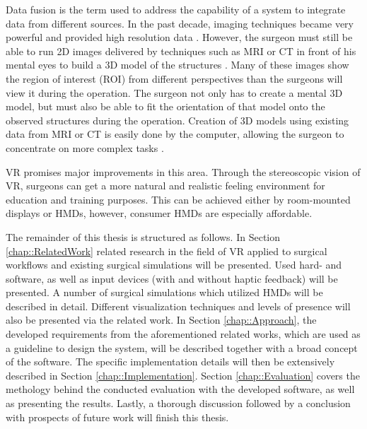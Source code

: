Data fusion is the term used to address the capability of a system to integrate data from different sources.
In the past decade, imaging techniques became very powerful and provided high resolution data \cite{RN2}.
However, the surgeon must still be able to run 2D images delivered by techniques such as MRI or CT in front of his mental eyes to build a 3D model of the structures \cite{Fonseca.2018}.
Many of these images show the region of interest (ROI) from different perspectives than the surgeons will view it during the operation.
The surgeon not only has to create a mental 3D model, but must also be able to fit the orientation of that model onto the observed structures during the operation.
Creation of 3D models using existing data from MRI or CT is easily done by the computer, allowing the surgeon to concentrate on more complex tasks \cite{486713}.

VR promises major improvements in this area.
Through the stereoscopic vision of VR, surgeons can get a more natural and realistic feeling environment for education and training purposes.
This can be achieved either by room-mounted displays or HMDs, however, consumer HMDs are especially affordable.





The remainder of this thesis is structured as follows. 
In Section \ref{chap::RelatedWork} related research in the field of VR applied to surgical workflows and existing surgical simulations will be presented.
Used hard- and software, as well as input devices (with and without haptic feedback) will be presented.
A number of surgical simulations which utilized HMDs will be described in detail.
Different visualization techniques and levels of presence will also be presented via the related work.
In Section \ref{chap::Approach}, the developed requirements from the aforementioned related works, which are used as a guideline to design the system, will be described 
together with a broad concept of the software.
The specific implementation details will then be extensively described in Section \ref{chap::Implementation}.
Section \ref{chap::Evaluation} covers the methology behind the conducted evaluation with the developed software, as well as presenting the results.
Lastly, a thorough discussion followed by a conclusion with prospects of future work will finish this thesis.